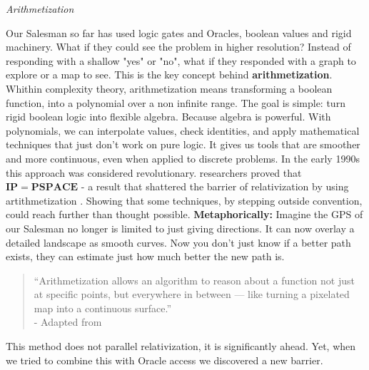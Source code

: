 \documentclass[12pt]{report}
\begin{document}
\begin{center}
    \vspace{0cm}
    {\Large\itshape Arithmetization\par}
\end{center}
Our Salesman so far has used logic gates and Oracles, boolean values and rigid machinery.
What if they could see the problem in higher resolution?
Instead of responding with a shallow "yes" or "no", what if they responded with a graph to explore or a map to see.
This is the key concept behind \textbf{arithmetization}.
Whithin complexity theory, arithmetization means transforming a boolean function, into a polynomial over a non infinite range.
The goal is simple: turn rigid boolean logic into flexible algebra.
Because algebra is powerful.
With polynomials, we can interpolate values, check identities, and apply mathematical techniques that just don't work on pure logic.
It gives us tools that are smoother and more continuous, even when applied to discrete problems.
In the early 1990s this approach was considered revolutionary.
researchers proved that $\mathbf{IP = PSPACE}$ - a result that shattered the barrier of relativization by using artithmetization \citep{arora2009}.
Showing that some techniques, by stepping outside convention, could reach further than thought possible.
\textbf{Metaphorically:}
Imagine the GPS of our Salesman no longer is limited to just giving directions.
It can now overlay a detailed landscape as smooth curves.
Now you don't just know if a better path exists, they can estimate just how much better the new path is.
\begin{quote}
    “Arithmetization allows an algorithm to reason about a function not just at specific points, but everywhere in between — like turning a pixelated map into a continuous surface.”\\
    - Adapted from \cite[Ch. 20.4]{arora2009}
\end{quote}
This method does not parallel relativization, it is significantly ahead.
Yet, when we tried to combine this with Oracle access we discovered a new barrier.
\end{document}
